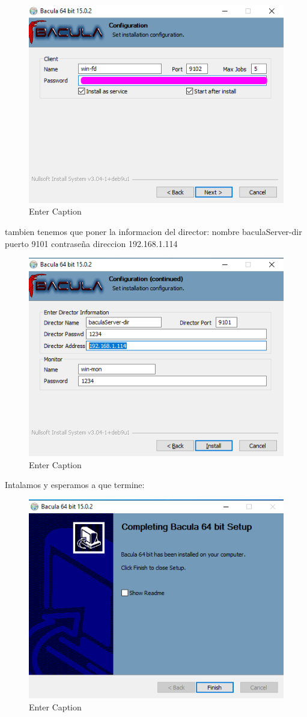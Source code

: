 \begin{figure}[H]
    \centering
    \includegraphics[width=0.5\linewidth]{instalacionBacula/configwinbaCULA.png}
    \caption{Enter Caption}
\end{figure}


tambien tenemos que poner la informacion del director: 
nombre baculaServer-dir
puerto 9101
contraseña
direccion 192.168.1.114

\begin{figure}[H]
    \centering
    \includegraphics[width=0.5\linewidth]{instalacionBacula/config2winbacula.png}
    \caption{Enter Caption}
\end{figure}

Intalamos y esperamos a que termine:

\begin{figure}[H]
    \centering
    \includegraphics[width=0.5\linewidth]{instalacionBacula/teminadoInstalarBaculawin.png}
    \caption{Enter Caption}
\end{figure}

